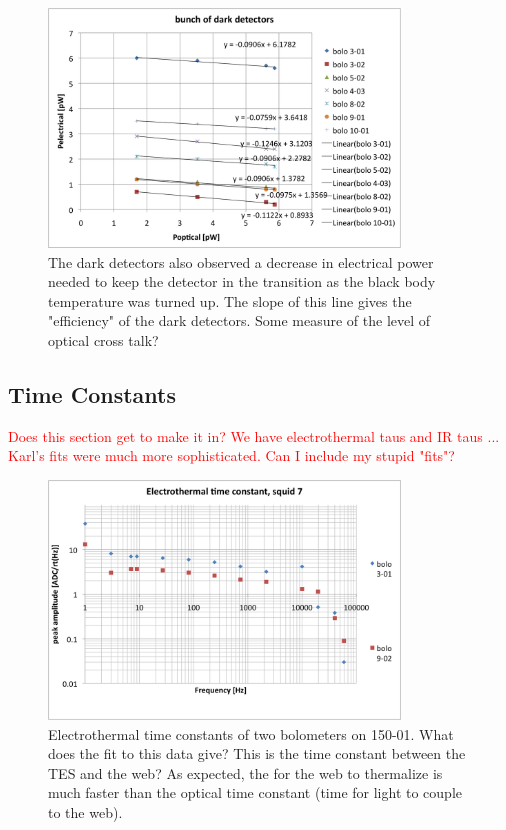 \begin{figure}[ht!]
\begin{center}
\includegraphics[height=2.5in]{figures/darkdetectoreffs}
\caption{The dark detectors also observed a decrease in electrical power needed to keep the detector in the transition as the black body temperature was turned up. The slope of this line gives the "efficiency" of the dark detectors. Some measure of the level of optical cross talk?
\label{fig:dark_optical_efficiencies} }
\end{center}
\end{figure}



\subsection{Time Constants}
\label{sec:time_constants}

\textcolor{red}{Does this section get to make it in? We have electrothermal taus and IR taus ... Karl's fits were much more sophisticated. Can I include my stupid "fits"?}

\begin{figure}[ht!]
\begin{center}
\includegraphics[height=2.5in]{figures/Nb01_squid7_etau_morepts}
\caption{Electrothermal time constants of two bolometers on 150-01. What does the fit to this data give? This is the time constant between the TES and the web? As expected, the for the web to thermalize is much faster than the optical time constant (time for light to couple to the web). 
\label{fig:electrothermal_tau} }
\end{center}
\end{figure}


